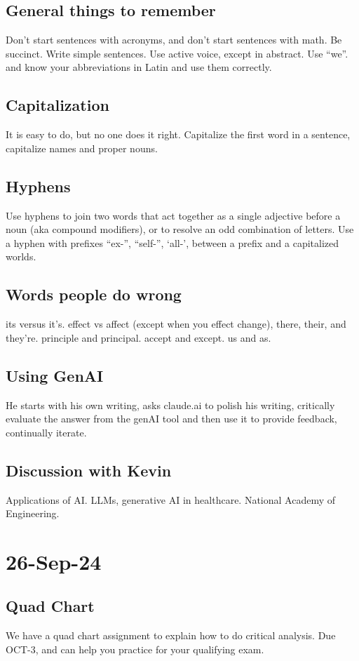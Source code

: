 \documentclass[10pt, oneside]{article}
\begin{document}
\subsection{General things to remember}
Don't start sentences with acronyms, and don't start sentences with math. Be succinct. Write simple sentences. Use active voice, except in abstract. Use ``we''. and know your abbreviations in Latin and use them correctly. 

\subsection{Capitalization}
It is easy to do, but no one does it right. Capitalize the first word in a sentence, capitalize names and proper nouns. 
\subsection{Hyphens}
Use hyphens to join two words that act together as a single adjective before a noun (aka compound modifiers), or to resolve an odd combination of letters. Use a hyphen with prefixes ``ex-'', ``self-'', `all-', between a prefix and a capitalized worlds. 

\subsection{Words people do wrong}
its versus it's. effect vs affect (except when you effect change), there, their, and they're. principle and principal. accept and except. us and as. 


\subsection{Using GenAI}
He starts with his own writing, asks claude.ai to polish his writing, critically evaluate the answer from the genAI tool and then use it to provide feedback, continually iterate. 

\subsection{Discussion with Kevin}
Applications of AI. LLMs, generative AI in healthcare. National Academy of Engineering.

\section{26-Sep-24}
\subsection{Quad Chart}
We have a quad chart assignment to explain how to do critical analysis. Due OCT-3, and can help you practice for your qualifying exam. 
\end{document}
